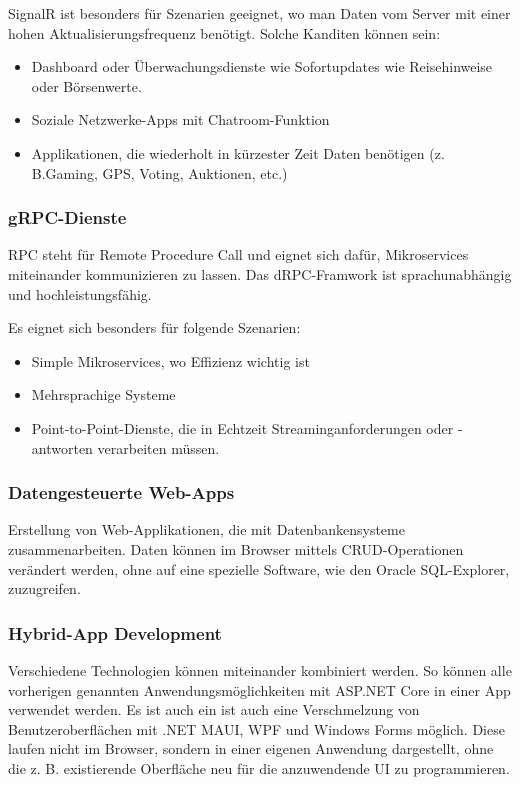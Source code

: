 SignalR ist besonders für Szenarien geeignet, wo man Daten vom Server mit einer hohen Aktualisierungsfrequenz benötigt. 
Solche Kanditen können sein:
\begin{itemize}
    \item Dashboard oder Überwachungsdienste wie Sofortupdates wie Reisehinweise oder Börsenwerte.
    \item Soziale Netzwerke-Apps mit Chatroom-Funktion
    \item Applikationen, die wiederholt in kürzester Zeit Daten benötigen (z. B.Gaming, GPS, Voting, Auktionen, etc.)
\end{itemize}

\subsubsection{gRPC-Dienste}
RPC steht für Remote Procedure Call und eignet sich dafür, Mikroservices miteinander kommunizieren zu lassen.
Das dRPC-Framwork ist sprachunabhängig und hochleistungsfähig.

Es eignet sich besonders für folgende Szenarien:
\begin{itemize}
    \item Simple Mikroservices, wo Effizienz wichtig ist
    \item Mehrsprachige Systeme
    \item Point-to-Point-Dienste, die in Echtzeit Streaminganforderungen oder -antworten verarbeiten müssen.
\end{itemize}

\subsubsection{Datengesteuerte Web-Apps}
Erstellung von Web-Applikationen, die mit Datenbankensysteme zusammenarbeiten. Daten können im 
Browser mittels CRUD-Operationen verändert werden, ohne auf eine spezielle Software, wie den Oracle SQL-Explorer, zuzugreifen.

\subsubsection{Hybrid-App Development}
Verschiedene Technologien können miteinander kombiniert werden. So können alle vorherigen genannten Anwendungsmöglichkeiten 
mit ASP.NET Core in einer App verwendet werden. 
Es ist auch ein ist auch eine Verschmelzung von Benutzeroberflächen mit .NET MAUI, WPF und Windows Forms möglich. Diese laufen nicht im Browser, 
sondern in einer eigenen Anwendung dargestellt, ohne die z. B. existierende Oberfläche neu für die anzuwendende UI zu programmieren.

